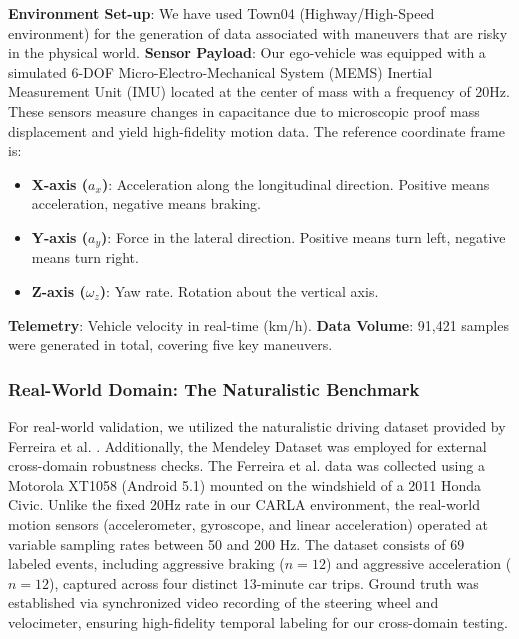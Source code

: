 \documentclass[pdflatex,sn-mathphys-num]{sn-jnl}
\theoremstyle{thmstyleone}
\theoremstyle{thmstyletwo}
\theoremstyle{thmstylethree}
\begin{document}
\textbf{Environment Set-up}: We have used Town04 (Highway/High-Speed environment) for the generation of data associated with maneuvers that are risky in the physical world.
\textbf{Sensor Payload}: Our ego-vehicle was equipped with a simulated 6-DOF Micro-Electro-Mechanical System (MEMS) Inertial Measurement Unit (IMU) located at the center of mass with a frequency of 20Hz. These sensors measure changes in capacitance due to microscopic proof mass displacement and yield high-fidelity motion data. The reference coordinate frame is:
\begin{itemize}
    \item \textbf{X-axis ($a_x$)}: Acceleration along the longitudinal direction. Positive means acceleration, negative means braking.
    \item \textbf{Y-axis ($a_y$)}: Force in the lateral direction. Positive means turn left, negative means turn right.
    \item \textbf{Z-axis ($\omega_z$)}: Yaw rate. Rotation about the vertical axis.
\end{itemize}
\textbf{Telemetry}: Vehicle velocity in real-time (km/h).
\textbf{Data Volume}: 91,421 samples were generated in total, covering five key maneuvers.

\FloatBarrier
\subsubsection{Real-World Domain: The Naturalistic Benchmark}
For real-world validation, we utilized the naturalistic driving dataset provided by Ferreira et al. \cite{ferreira2017}. Additionally, the Mendeley Dataset \cite{nazirkar2021} was employed for external cross-domain robustness checks. The Ferreira et al. data was collected using a Motorola XT1058 (Android 5.1) mounted on the windshield of a 2011 Honda Civic.
 Unlike the fixed 20Hz rate in our CARLA environment, the real-world motion sensors (accelerometer, gyroscope, and linear acceleration) operated at variable sampling rates between 50 and 200 Hz. The dataset consists of 69 labeled events, including aggressive braking ($n=12$) and aggressive acceleration ($n=12$), captured across four distinct 13-minute car trips. Ground truth was established via synchronized video recording of the steering wheel and velocimeter, ensuring high-fidelity temporal labeling for our cross-domain testing.
\end{document}
